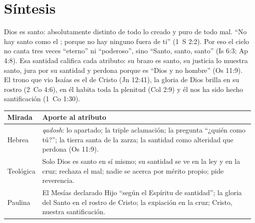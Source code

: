 \section{Síntesis}

\begin{tcolorbox}[colback=papiro,colframe=azul,boxrule=1pt,arc=3pt]
Dios es santo: absolutamente distinto de todo lo creado y puro de todo mal. ``No hay santo como el \SENOR; porque no hay ninguno fuera de ti'' (1~S 2:2). Por eso el cielo no canta tres veces ``eterno'' ni ``poderoso'', sino ``Santo, santo, santo'' (Is 6:3; Ap 4:8). Esa santidad califica cada atributo: su brazo es santo, su justicia lo muestra santo, jura por su santidad y perdona porque es ``Dios y no hombre'' (Os 11:9). El trono que vio Isaías es el de Cristo (Jn 12:41), la gloria de Dios brilla en su rostro (2~Co 4:6), en él habita toda la plenitud (Col 2:9) y él nos ha sido hecho santificación (1~Co 1:30).
\end{tcolorbox}

\begin{center}\small\renewcommand{\arraystretch}{1.3}
\begin{tabular}{@{}L{3.0cm}L{11.4cm}@{}}
\toprule
\textbf{Mirada} & \textbf{Aporte al atributo} \\ \midrule
Hebrea & \emph{qadosh}: lo apartado; la triple aclamación; la pregunta ``¿quién como tú?''; la tierra santa de la zarza; la santidad como alteridad que perdona (Os 11:9). \\
Teológica & Solo Dios es santo en sí mismo; su santidad se ve en la ley y en la cruz; rechaza el mal; nadie se acerca por mérito propio; pide reverencia. \\
Paulina & El Mesías declarado Hijo ``según el Espíritu de santidad''; la gloria del Santo en el rostro de Cristo; la expiación en la cruz; Cristo, nuestra santificación. \\
\bottomrule
\end{tabular}\end{center}

